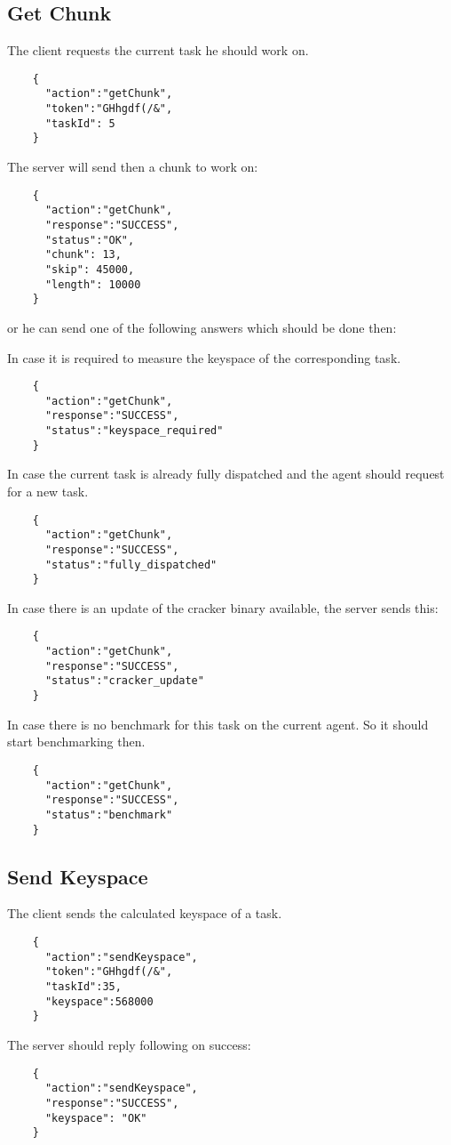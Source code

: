 \documentclass{article}
\begin{document}
	\subsection*{Get Chunk}
	The client requests the current task he should work on.
	\begin{verbatim}
	{
	  "action":"getChunk", 
	  "token":"GHhgdf(/&",
	  "taskId": 5
	}
	\end{verbatim}
	The server will send then a chunk to work on:
	\begin{verbatim}
	{
	  "action":"getChunk",
	  "response":"SUCCESS",
	  "status":"OK",
	  "chunk": 13,
	  "skip": 45000,
	  "length": 10000
	}
	\end{verbatim}
	or he can send one of the following answers which should be done then:
	
	In case it is required to measure the keyspace of the corresponding task.
	\begin{verbatim}
	{
	  "action":"getChunk",
	  "response":"SUCCESS",
	  "status":"keyspace_required"
	}
	\end{verbatim}
	
	In case the current task is already fully dispatched and the agent should request for a new task.
	\begin{verbatim}
	{
	  "action":"getChunk",
	  "response":"SUCCESS",
	  "status":"fully_dispatched"
	}
	\end{verbatim}
	
	In case there is an update of the cracker binary available, the server sends this:
	\begin{verbatim}
	{
	  "action":"getChunk",
	  "response":"SUCCESS",
	  "status":"cracker_update"
	}
	\end{verbatim}
	
	In case there is no benchmark for this task on the current agent. So it should start benchmarking then.
	\begin{verbatim}
	{
	  "action":"getChunk",
	  "response":"SUCCESS",
	  "status":"benchmark"
	}
	\end{verbatim}
	
	
	\subsection*{Send Keyspace}
	The client sends the calculated keyspace of a task.
	\begin{verbatim}
	{
	  "action":"sendKeyspace",
	  "token":"GHhgdf(/&",
	  "taskId":35,
	  "keyspace":568000
	}
	\end{verbatim}
	The server should reply following on success:
	\begin{verbatim}
	{
	  "action":"sendKeyspace",
	  "response":"SUCCESS",
	  "keyspace": "OK"
	}
	\end{verbatim}
	
\end{document}
